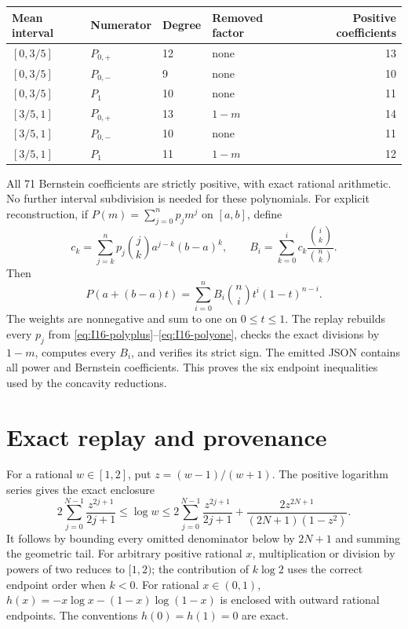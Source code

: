 \documentclass[11pt]{article}
\theoremstyle{remark}\newtheorem{remark}[theorem]{Remark}
\numberwithin{equation}{section}
\begin{document}
\begin{center}
\begin{tabular}{llllr}
\toprule
Mean interval & Numerator & Degree & Removed factor & Positive coefficients\\
\midrule
$[0,3/5]$ & $P_{0,+}$ & 12 & none & 13\\
$[0,3/5]$ & $P_{0,-}$ & 9 & none & 10\\
$[0,3/5]$ & $P_1$ & 10 & none & 11\\
$[3/5,1]$ & $P_{0,+}$ & 13 & $1-m$ & 14\\
$[3/5,1]$ & $P_{0,-}$ & 10 & none & 11\\
$[3/5,1]$ & $P_1$ & 11 & $1-m$ & 12\\
\bottomrule
\end{tabular}
\end{center}
All 71 Bernstein coefficients are strictly positive, with exact rational
arithmetic. No further interval subdivision is needed for these polynomials.
For explicit reconstruction, if $P(m)=\sum_{j=0}^n p_jm^j$ on $[a,b]$, define
\[
 c_k=\sum_{j=k}^n p_j{j\choose k}a^{j-k}(b-a)^k,
 \qquad
 B_i=\sum_{k=0}^i c_k\frac{{i\choose k}}{{n\choose k}}.
\]
Then
\[
 P(a+(b-a)t)=\sum_{i=0}^n B_i{n\choose i}t^i(1-t)^{n-i}.
\]
The weights are nonnegative and sum to one on $0\le t\le1$.
The replay rebuilds every $p_j$ from \eqref{eq:I16-polyplus}--\eqref{eq:I16-polyone},
checks the exact divisions by $1-m$, computes every $B_i$, and verifies its
strict sign. The emitted JSON contains all power and Bernstein coefficients.
This proves the six endpoint inequalities used by the concavity reductions.

\section{Exact replay and provenance}\label{app:replay}
For a rational $w\in[1,2]$, put $z=(w-1)/(w+1)$. The positive logarithm
series gives the exact enclosure
\begin{equation}\label{eq:I16-log-enclosure}
 2\sum_{j=0}^{N-1}\frac{z^{2j+1}}{2j+1}
 \le\log w\le
 2\sum_{j=0}^{N-1}\frac{z^{2j+1}}{2j+1}
 +\frac{2z^{2N+1}}{(2N+1)(1-z^2)}.
\end{equation}
It follows by bounding every omitted denominator below by $2N+1$ and
summing the geometric tail. For arbitrary positive rational $x$, multiplication
or division by powers of two reduces to $[1,2)$; the contribution of $k\log2$
uses the correct endpoint order when $k<0$. For rational $x\in(0,1)$,
$h(x)=-x\log x-(1-x)\log(1-x)$ is enclosed with outward rational endpoints.
The conventions $h(0)=h(1)=0$ are exact.
\end{document}
